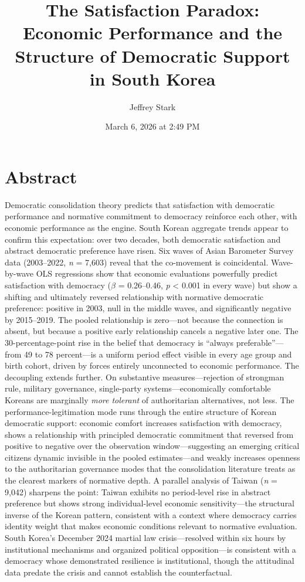 \documentclass[
  12pt,
  12pt,
  letterpaper]{article}
\title{The Satisfaction Paradox: Economic Performance and the Structure
of Democratic Support in South Korea}
\author{Jeffrey Stark}
\date{March 6, 2026 at 2:49 PM}
\begin{document}
\maketitle


\section*{Abstract}\label{abstract}


Democratic consolidation theory predicts that satisfaction with
democratic performance and normative commitment to democracy reinforce
each other, with economic performance as the engine. South Korean
aggregate trends appear to confirm this expectation: over two decades,
both democratic satisfaction and abstract democratic preference have
risen. Six waves of Asian Barometer Survey data (2003--2022, \emph{n} =
7,603) reveal that the co-movement is coincidental. Wave-by-wave OLS
regressions show that economic evaluations powerfully predict
satisfaction with democracy (\(\beta\) = 0.26--0.46, \emph{p}
\textless{} 0.001 in every wave) but show a shifting and ultimately
reversed relationship with normative democratic preference: positive in
2003, null in the middle waves, and significantly negative by
2015--2019. The pooled relationship is zero---not because the connection
is absent, but because a positive early relationship cancels a negative
later one. The 30-percentage-point rise in the belief that democracy is
``always preferable''---from 49 to 78 percent---is a uniform period
effect visible in every age group and birth cohort, driven by forces
entirely unconnected to economic performance. The decoupling extends
further. On substantive measures---rejection of strongman rule, military
governance, single-party systems---economically comfortable Koreans are
marginally \emph{more tolerant} of authoritarian alternatives, not less.
The performance-legitimation mode runs through the entire structure of
Korean democratic support: economic comfort increases satisfaction with
democracy, shows a relationship with principled democratic commitment
that reversed from positive to negative over the observation
window---suggesting an emerging critical citizens dynamic invisible in
the pooled estimates---and weakly increases openness to the
authoritarian governance modes that the consolidation literature treats
as the clearest markers of normative depth. A parallel analysis of
Taiwan (\emph{n} = 9,042) sharpens the point: Taiwan exhibits no
period-level rise in abstract preference but shows strong
individual-level economic sensitivity---the structural inverse of the
Korean pattern, consistent with a context where democracy carries
identity weight that makes economic conditions relevant to normative
evaluation. South Korea's December 2024 martial law crisis---resolved
within six hours by institutional mechanisms and organized political
opposition---is consistent with a democracy whose demonstrated
resilience is institutional, though the attitudinal data predate the
crisis and cannot establish the counterfactual.
\end{document}
